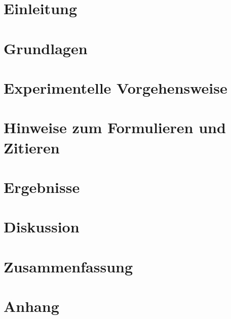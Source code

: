 \documentclass[bachelor,       %
               twoside,        %
               BCOR10mm,       %
               ngerman,english  %
               ]{GAUBM}
\begin{document}
\mainmatter   %

\chapter{Einleitung}
\chapter{Grundlagen}
\chapter{Experimentelle Vorgehensweise}
\chapter{Hinweise zum Formulieren und Zitieren}
\chapter{Ergebnisse}
\chapter{Diskussion}
\chapter{Zusammenfassung}

\appendix
\chapter{Anhang}


\cleardoublepage
 


\begin{otherlanguage}{ngerman}
\Declaration
\end{otherlanguage}
\end{document}

